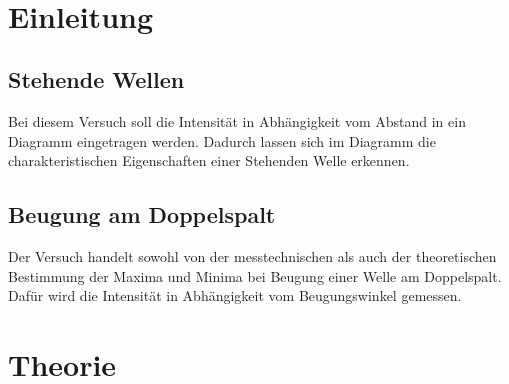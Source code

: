 \documentclass[a4paper]{scrartcl}
\def\header#1#2{
  \begin{center}
    {\Large #1}\\
    {#2}
  \end{center}
}
\numberwithin{equation}{subsection}
\begin{document}
\vspace{10pt}
\header{\HEADDING}{\SUBHEADDING}

\tableofcontents

\newpage

\section{Einleitung}
\subsection{Stehende Wellen}
Bei diesem Versuch soll die Intensität in Abhängigkeit vom Abstand in ein Diagramm eingetragen werden. Dadurch lassen sich im Diagramm die charakteristischen Eigenschaften einer Stehenden Welle erkennen.
\subsection{Beugung am Doppelspalt}
Der Versuch handelt sowohl von der messtechnischen als auch der theoretischen Bestimmung der Maxima und Minima bei Beugung einer Welle am Doppelspalt. Dafür wird die Intensität in Abhängigkeit vom Beugungswinkel gemessen.

\newpage

\section{Theorie}
\end{document}
